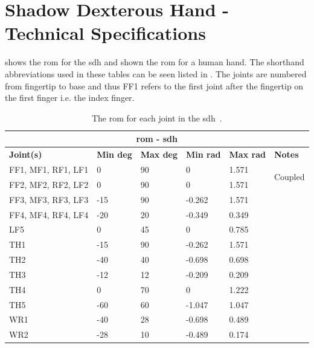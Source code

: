 \chapter{Shadow Dexterous Hand - Technical Specifications}\label{app:shadow-dexterous-hand-technical-specifications}

 shows the \gls{rom} for the \gls{sdh} and  shown the \gls{rom} for a human hand. The shorthand abbreviations used in these tables can be seen listed in . The joints are numbered from fingertip to base and thus FF1 refers to the first joint after the fingertip on the first finger i.e. the index finger.
\begin{table}[!h]
\begin{center}
	\begin{tabular}{ |p{}|p{}|p{}|p{}|p{}|p{}| } 
	\hline
	\multicolumn{6}{|c|}{\textbf{\gls{rom} - \gls{sdh}}} \\ \hline
	\textbf{Joint(s)} & \textbf{Min deg} & \textbf{Max deg} & \textbf{Min rad} & \textbf{Max rad} & \textbf{Notes} \\ \hline
	FF1, MF1, RF1, LF1 &0&90&0&1.571  & \multirow{2}{4em}{Coupled}\\ \cline{1-5}
	FF2, MF2, RF2, LF2 & 0   & 90 & 0      & 1.571 & \\ \hline
	FF3, MF3, RF3, LF3 & -15 & 90 & -0.262 & 1.571 & \\ \hline
	FF4, MF4, RF4, LF4 & -20 & 20 & -0.349 & 0.349 & \\ \hline
	LF5&0&45&0&0.785 &  \\ \hline
	TH1&-15&90&-0.262&1.571 &  \\ \hline
	TH2&-40&40&-0.698&0.698 &  \\ \hline
	TH3&-12&12&-0.209&0.209 &  \\ \hline
	TH4&0&70&0&1.222& \\ \hline
	TH5&-60&60&-1.047&1.047& \\ \hline
	WR1&-40&28&-0.698&0.489& \\ \hline
	WR2&-28&10&-0.489&0.174& \\ \hline
	\end{tabular}
	\caption{The \gls{rom} for each joint in the \gls{sdh}~\cite{range-of-motion-shadow-hand}.}
	\label{app:range-of-motion-shadow-hand}
\end{center}
\end{table}

